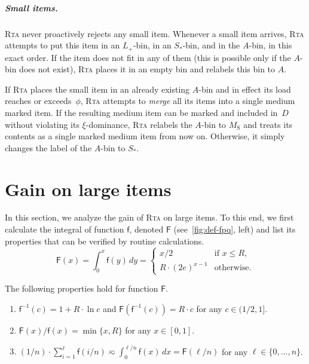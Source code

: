 \documentclass[a4paper,USenglish,cleveref]{lipics-v2019}
\newcommand{\R}{\ensuremath{R}}
\newcommand{\M}{\ensuremath{M_\mathrm{S}}\xspace}
\newcommand{\A}{\ensuremath{A}\xspace}
\newcommand{\ST}{\ensuremath{S_*}\xspace}
\newcommand{\LT}{\ensuremath{L_+}\xspace}
\newcommand{\smallBoundary}{\ensuremath{\phi}}
\newcommand{\f}{\textsf{f}}
\newcommand{\g}{\ensuremath{\xi}}
\newcommand{\fintegral}{\textsf{F}}
\newcommand{\ALG}{\textsc{Rta}\xspace}
\begin{document}
\subparagraph{Small items.}

\ALG never proactively rejects any small item. Whenever a small item arrives,
\ALG attempts to put this item in an \LT-bin, in an \ST-bin, and in the \A-bin,
in this exact order. If the item does not fit in any of them (this is possible
only if the \A-bin does not exist), \ALG places it in an empty bin and relabels
this bin to \A.

If \ALG places the small item in an already existing \A-bin and in effect its load
reaches or exceeds~$\smallBoundary$, \ALG attempts to \emph{merge} all its items into a single
medium marked item. If the resulting medium item can be marked
and included in~$D$ without violating its $\g$-dominance, 
\ALG relabels the \A-bin to \M and treats its contents as a single marked medium
item from now on. Otherwise, it simply changes the label of the \A-bin to \ST.




\section{Gain on large items}
\label{sec:large1}

In this section, we analyze the gain of \ALG on large items. To this end, we
first calculate the integral of function $\f$, denoted $\fintegral$
(see~\cref{fig:def-fpq}, left) and list its properties that can be verified by
routine calculations. 
%
\begin{equation}
\fintegral(x) = \int_0^x \f(y)\, dy =
  \begin{cases}
    x/2 & \mbox{if } x \leq \R,\\
    \R\cdot(2e)^{x-1} & \mbox{otherwise.}
  \end{cases}
  \label{eq:Ff}
\end{equation}

\begin{lemma}
\label{lem:F-properties}
The following properties hold for function $\fintegral$. 
\begin{enumerate}
  \item $\f^{-1}(c) = 1 + \R \cdot \ln c$ and 
  $\fintegral(\f^{-1}(c)) =  \R \cdot c$ 
  for any $c \in (1/2,1]$.
\item $\fintegral(x) / \f(x) = \min \{x,\R\}$ for any $x \in [0,1]$.
\item $(1/n) \cdot \sum_{i=1}^\ell \f(i/n) \eqsim \int_0^{\ell/n} \f(x)\, dx = \fintegral(\ell/n)$
for any $\ell \in \{0, \ldots, n\}$.
\end{enumerate}
\end{lemma}
\end{document}
